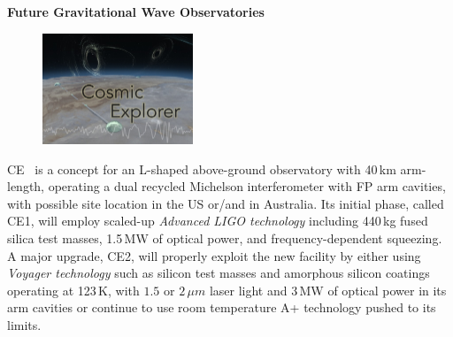 \begin{DetBox}{\bf Future Gravitational Wave Observatories}
\begin{tcolorbox}[standard jigsaw,colframe=antiquefuchsia!80!black,colback=antiquefuchsia!20!white,opacityback=0.6,coltext=black,size=small, title=Cosmic Explorer (CE)] 
\begin{figure}
\vspace{-10pt}
\includegraphics*[width=0.4\textwidth]{Figures/CE_Thumb.jpg}
\label{fig:CE_Thumb}
\vspace{-20pt}
\end{figure}
CE~\cite{CosmicExplorer2017} is a concept for an L-shaped above-ground observatory with 40\,km arm-length, operating a dual recycled Michelson interferometer with \ac{FP}  arm cavities, with possible site location in the US or/and in Australia. 
Its initial phase, called \ac{CE1}, will employ scaled-up \emph{Advanced LIGO technology} including 440\,kg fused silica test masses, 1.5\,MW of optical power, and frequency-dependent squeezing. 
A major upgrade, \ac{CE2}, will properly exploit the new facility by either using \emph{Voyager technology} such as silicon test masses and amorphous silicon coatings operating at 123\,K, with $1.5$ or $2\,\mu m$ laser light and 3\,MW of optical power in its arm cavities or continue to use room temperature A+ technology pushed to its limits.

\end{tcolorbox}

\begin{tcolorbox}[standard jigsaw,colframe=azure!70!black,colback=azure!20!white,opacityback=0.6,coltext=black, size=small, title=Voyager]


\end{tcolorbox}
\end{DetBox}
